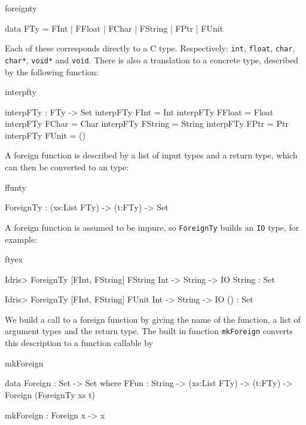 \begin{SaveVerbatim}{foreignty}

data FTy = FInt | FFloat | FChar | FString | FPtr | FUnit

\end{SaveVerbatim}

\noindent
Each of these corresponds directly to a C type. Respectively: \texttt{int},
\texttt{float}, \texttt{char}, \texttt{char*}, \texttt{void*} and \texttt{void}.
There is also a translation to a concrete \Idris{} type, described by the
following function:

\begin{SaveVerbatim}{interpfty}

interpFTy : FTy -> Set
interpFTy FInt    = Int
interpFTy FFloat  = Float
interpFTy FChar   = Char
interpFTy FString = String
interpFTy FPtr    = Ptr
interpFTy FUnit   = ()

\end{SaveVerbatim}

\noindent
A foreign function is described by a list of input types and a return type, which
can then be converted to an \Idris{} type:

\begin{SaveVerbatim}{ffunty}

ForeignTy : (xs:List FTy) -> (t:FTy) -> Set

\end{SaveVerbatim}

\noindent
A foreign function is assumed to be impure, so \texttt{ForeignTy} builds an
\texttt{IO} type, for example:

\begin{SaveVerbatim}{ftyex}

Idris> ForeignTy [FInt, FString] FString
Int -> String -> IO String : Set

Idris> ForeignTy [FInt, FString] FUnit 
Int -> String -> IO () : Set

\end{SaveVerbatim}

\noindent
We build a call to a foreign function by giving the name of the function, a list of
argument types and the return type. The built in function \texttt{mkForeign}
converts this description to a function callable by \Idris{}

\begin{SaveVerbatim}{mkForeign}

data Foreign : Set -> Set where
    FFun : String -> (xs:List FTy) -> (t:FTy) -> 
           Foreign (ForeignTy xs t)

mkForeign : Foreign x -> x

\end{SaveVerbatim}

